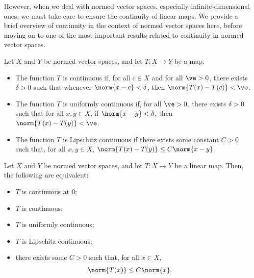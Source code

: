 \documentclass[10pt]{mypackage2}
\begin{document}
However, when we deal with normed vector spaces, especially infinite-dimensional ones, we must take care to ensure the continuity of linear maps. We provide a brief overview of continuity in the context of normed vector spaces here, before moving on to one of the most important results related to continuity in normed vector spaces.
\begin{definition}
  Let $X$ and $Y$ be normed vector spaces, and let $T\colon X\rightarrow Y$ be a map.
  \begin{itemize}
    \item The function $T$ is continuous if, for all $c\in X$ and for all $\ve > 0$, there exists $\delta > 0$ such that whenever $\norm{x-c} < \delta$, then $\norm{T(x) - T(c)} < \ve$.
    \item The function $T$ is uniformly continuous if, for all $\ve > 0$, there exists $\delta > 0 $ such that for all $x,y\in X$, if $\norm{x-y} < \delta$, then $\norm{T(x) - T(y)} < \ve$.
    \item The function $T$ is Lipschitz continuous if there exists some constant $C > 0$ such that, for all $x,y\in X$, $\norm{T(x)-T(y)}\leq C\norm{x-y}$.
  \end{itemize}
\end{definition}
\begin{theorem}
  Let $X$ and $Y$ be normed vector spaces, and let $T\colon X\rightarrow Y$ be a linear map. Then, the following are equivalent:
  \begin{itemize}
    \item $T$ is continuous at $0$;
    \item $T$ is continuous;
    \item $T$ is uniformly continuous;
    \item $T$ is Lipschitz continuous;
    \item there exists some $C > 0$ such that, for all $x\in X$,
      \begin{align*}
        \norm{T(x)} &\leq C\norm{x}.
      \end{align*}
  \end{itemize}
\end{theorem}
\end{document}
